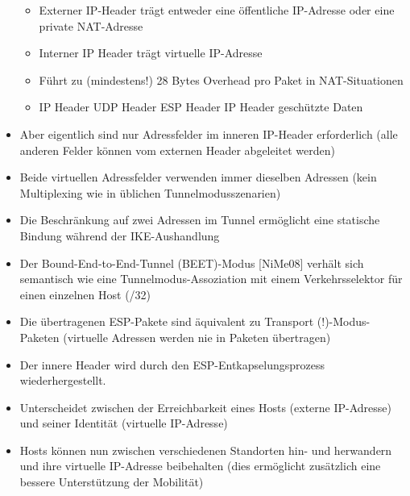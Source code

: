 \documentclass[a4paper]{article}
\begin{document}
\begin{multicols}{3}
\begin{itemize}
              \begin{itemize}
                  \item
                        Externer IP-Header trägt entweder eine öffentliche IP-Adresse oder
                        eine private NAT-Adresse
                  \item
                        Interner IP Header trägt virtuelle IP-Adresse
                  \item
                        Führt zu (mindestens!) 28 Bytes Overhead pro Paket in
                        NAT-Situationen
                  \item
                        \textbar{} IP Header \textbar{} UDP Header \textbar{} ESP Header
                        \textbar{} IP Header \textbar{} geschützte Daten \textbar{}
              \end{itemize}
        \item
              Aber eigentlich sind nur Adressfelder im inneren IP-Header
              erforderlich (alle anderen Felder können vom externen Header
              abgeleitet werden)
        \item
              Beide virtuellen Adressfelder verwenden immer dieselben Adressen (kein
              Multiplexing wie in üblichen Tunnelmodusszenarien)
        \item
              Die Beschränkung auf zwei Adressen im Tunnel ermöglicht eine statische
              Bindung während der IKE-Aushandlung
        \item
              Der Bound-End-to-End-Tunnel (BEET)-Modus {[}NiMe08{]} verhält sich
              semantisch wie eine Tunnelmodus-Assoziation mit einem Verkehrsselektor
              für einen einzelnen Host (/32)
        \item
              Die übertragenen ESP-Pakete sind äquivalent zu Transport
              (!)-Modus-Paketen (virtuelle Adressen werden nie in Paketen
              übertragen)
        \item
              Der innere Header wird durch den ESP-Entkapselungsprozess
              wiederhergestellt.
        \item
              Unterscheidet zwischen der Erreichbarkeit eines Hosts (externe
              IP-Adresse) und seiner Identität (virtuelle IP-Adresse)
        \item
              Hosts können nun zwischen verschiedenen Standorten hin- und herwandern
              und ihre virtuelle IP-Adresse beibehalten (dies ermöglicht zusätzlich
              eine bessere Unterstützung der Mobilität)
    \end{itemize}



\end{multicols}
\end{document}
